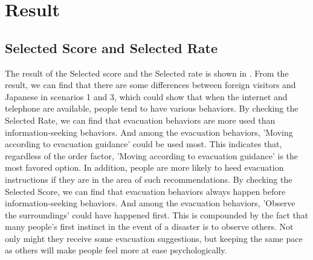 \section{Result}


\subsection{Selected Score and Selected Rate}
The result of the Selected score and the Selected rate is shown in . From the result, we can find that there are some differences between foreign visitors and Japanese in scenarios 1 and 3, which could show that when the internet and telephone are available, people tend to have various behaviors. By checking the Selected Rate, we can find that evacuation behaviors are more used than information-seeking behaviors. And among the evacuation behaviors, 'Moving according to evacuation guidance' could be used most. This indicates that, regardless of the order factor, 'Moving according to evacuation guidance' is the most favored option. In addition, people are more likely to heed evacuation instructions if they are in the area of such recommendations.  By checking the Selected Score, we can find that evacuation behaviors always happen before information-seeking behaviors. And among the evacuation behaviors, 'Observe the surroundings' could have happened first. This is compounded by the fact that many people's first instinct in the event of a disaster is to observe others. Not only might they receive some evacuation suggestions, but keeping the same pace as others will make people feel more at ease psychologically. 

